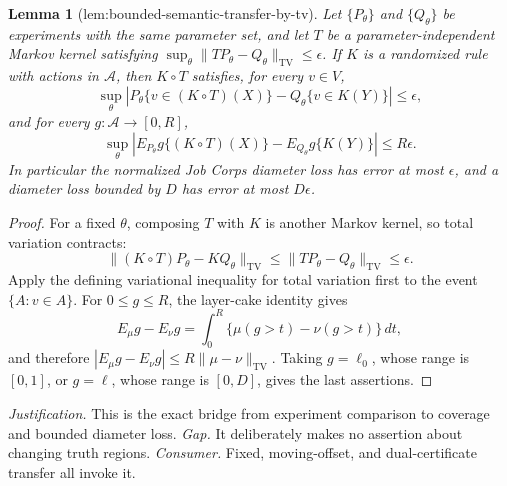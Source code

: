 \documentclass{article}
\newtheorem{lemma}{Lemma}
\begin{document}
\begin{lemma}[lem:bounded-semantic-transfer-by-tv]\label{lem:bounded-semantic-transfer-by-tv}
Let \(\{P_\theta\}\) and \(\{Q_\theta\}\) be experiments with the same parameter set, and let \(T\) be a parameter-independent Markov kernel satisfying
\(\sup_\theta\|TP_\theta-Q_\theta\|_{\mathrm{TV}}\le\epsilon\). If \(K\) is a randomized rule with actions in \(\mathcal A\), then \(K\circ T\) satisfies, for every \(v\in V\),
\[
 \sup_\theta\left|P_\theta\{v\in(K\circ T)(X)\}
 -Q_\theta\{v\in K(Y)\}\right|\le\epsilon,
\]
and for every \(g:\mathcal A\to[0,R]\),
\[
 \sup_\theta\left|E_{P_\theta}g\{(K\circ T)(X)\}
 -E_{Q_\theta}g\{K(Y)\}\right|\le R\epsilon.
\]
In particular the normalized Job Corps diameter loss has error at most \(\epsilon\), and a diameter loss bounded by \(D\) has error at most \(D\epsilon\).
\end{lemma}
\begin{proof}
For a fixed \(\theta\), composing \(T\) with \(K\) is another Markov kernel, so total variation contracts:
\[
 \|(K\circ T)P_\theta-KQ_\theta\|_{\mathrm{TV}}
 \le \|TP_\theta-Q_\theta\|_{\mathrm{TV}}\le\epsilon.
\]
Apply the defining variational inequality for total variation first to the event \(\{A:v\in A\}\). For \(0\le g\le R\), the layer-cake identity gives
\[
 E_\mu g-E_\nu g
 =\int_0^R\{\mu(g>t)-\nu(g>t)\}\,dt,
\]
and therefore \(|E_\mu g-E_\nu g|\le R\|\mu-\nu\|_{\mathrm{TV}}\). Taking \(g=\ell_0\), whose range is \([0,1]\), or \(g=\ell\), whose range is \([0,D]\), gives the last assertions.
\end{proof}
\par\smallskip\noindent \textit{Justification.} This is the exact bridge from experiment comparison to coverage and bounded diameter loss. \textit{Gap.} It deliberately makes no assertion about changing truth regions. \textit{Consumer.} Fixed, moving-offset, and dual-certificate transfer all invoke it.
\end{document}
